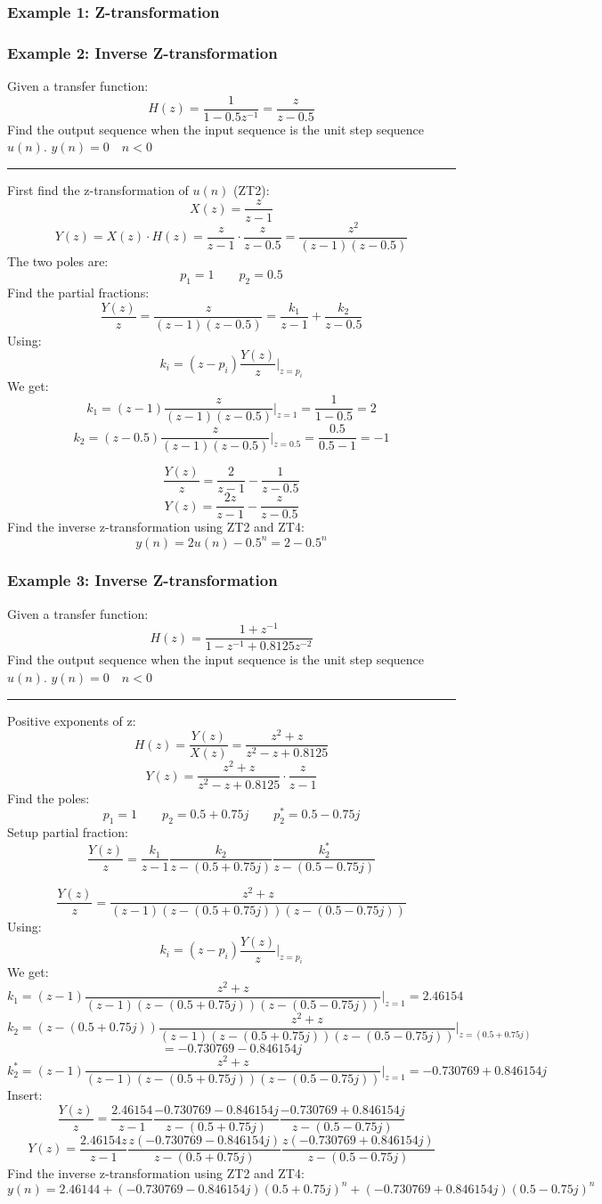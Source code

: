 \subsubsection{Example 1: Z-transformation}
\subsubsection{Example 2: Inverse Z-transformation}
Given a transfer function:
$$H(z)=\frac{1}{1-0.5z^{-1}}=\frac{z}{z-0.5}$$
Find the output sequence when the input sequence is the unit step sequence $u(n)$. $y(n)=0\quad n<0$

\rule{\textwidth}{0.5pt}

First find the z-transformation of $u(n)$ (ZT2):
$$X(z)=\frac{z}{z-1}$$
$$Y(z)=X(z)\cdot H(z)=\frac{z}{z-1}\cdot \frac{z}{z-0.5}=\frac{z^2}{(z-1)(z-0.5)}$$
The two poles are:
$$p_1=1\qquad p_2=0.5$$
Find the partial fractions:
$$\frac{Y(z)}{z}=\frac{z}{(z-1)(z-0.5)}=\frac{k_1}{z-1}+\frac{k_2}{z-0.5}$$
Using:
$$k_{i}=(z-p_{i})\frac{Y(z)}{z}\vert_{z=p_{i}}$$
We get:
$$k_{1}=(z-1)\frac{z}{(z-1)(z-0.5)}\vert_{z=1}=\frac{1}{1-0.5}=2$$
$$k_{2}=(z-0.5)\frac{z}{(z-1)(z-0.5)}\vert_{z=0.5}=\frac{0.5}{0.5-1}=-1$$

$$\frac{Y(z)}{z}=\frac{2}{z-1}-\frac{1}{z-0.5}$$
$$Y(z)=\frac{2z}{z-1}-\frac{z}{z-0.5}$$
Find the inverse z-transformation using ZT2 and ZT4:
$$y(n)=2u(n)-0.5^{n}=2-0.5^{n}$$

\subsubsection{Example 3: Inverse Z-transformation}
Given a transfer function:
$$H(z)=\frac{1+z^{-1}}{1-z^{-1}+0.8125z^{-2}}$$
Find the output sequence when the input sequence is the unit step sequence $u(n)$. $y(n)=0\quad n<0$

\rule{\textwidth}{0.5pt}

Positive exponents of z:
$$H(z)=\frac{Y(z)}{X(z)}=\frac{z^2+z}{z^2-z+0.8125}$$
$$Y(z)=\frac{z^2+z}{z^2-z+0.8125}\cdot \frac{z}{z-1}$$
Find the poles:
$$p_1=1\qquad p_2=0.5 +0.75j\qquad p_2^*=0.5 -0.75j$$
Setup partial fraction:
$$\frac{Y(z)}{z}=\frac{k_1}{z-1}\frac{k_2}{z-(0.5+0.75j)}\frac{k_2^*}{z-(0.5-0.75j)}$$

$$\frac{Y(z)}{z}=\frac{z^2+z}{(z-1)(z-(0.5+0.75j))(z-(0.5-0.75j))}$$
Using:
$$k_{i}=(z-p_{i})\frac{Y(z)}{z}\vert_{z=p_{i}}$$
We get:
$$k_{1}=(z-1)\frac{z^2+z}{(z-1)(z-(0.5+0.75j))(z-(0.5-0.75j))}\vert_{z=1}=2.46154$$
$$k_{2}=(z-(0.5+0.75j))\frac{z^2+z}{(z-1)(z-(0.5+0.75j))(z-(0.5-0.75j))}\vert_{z=(0.5+0.75j)}$$
$$=-0.730769-0.846154j$$
$$k_{2}^*=(z-1)\frac{z^2+z}{(z-1)(z-(0.5+0.75j))(z-(0.5-0.75j))}\vert_{z=1}=-0.730769+0.846154j$$
Insert:
$$\frac{Y(z)}{z}=\frac{2.46154}{z-1}\frac{-0.730769-0.846154j}{z-(0.5+0.75j)}\frac{-0.730769+0.846154j}{z-(0.5-0.75j)}$$
$$Y(z)=\frac{2.46154z}{z-1}\frac{z(-0.730769-0.846154j)}{z-(0.5+0.75j)}\frac{z(-0.730769+0.846154j)}{z-(0.5-0.75j)}$$
Find the inverse z-transformation using ZT2 and ZT4:
$$y(n)=2.46144 +(-0.730769-0.846154j)(0.5+0.75j)^n+(-0.730769+0.846154j)(0.5-0.75j)^n$$

